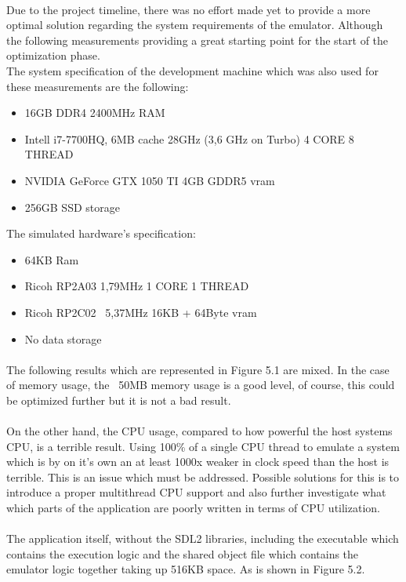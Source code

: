 \documentclass[]{report}
\begin{document}
\paragraph{ }
Due to the project timeline, there was no effort made yet to provide a more optimal solution regarding the system requirements of the emulator. Although the following measurements providing a great starting point for the start of the optimization phase.  
\\
The system specification of the development machine which was also used for these measurements are the following: 
\begin{itemize}
	\item 16GB DDR4 2400MHz RAM
	\item Intell i7-7700HQ, 6MB cache 28GHz (3,6 GHz on Turbo) 4 CORE 8 THREAD
	\item NVIDIA GeForce GTX 1050 TI 4GB GDDR5 vram
	\item 256GB SSD storage
\end{itemize}
\pagebreak
The simulated hardware's specification:
\begin{itemize}
	\item 64KB Ram
	\item Ricoh RP2A03 1,79MHz 1 CORE 1 THREAD
	\item Ricoh RP2C02 ~5,37MHz 16KB + 64Byte vram
	\item No data storage 
\end{itemize}

\paragraph{ }
The following results which are represented in Figure 5.1 are mixed. In the case of memory usage, the ~50MB memory usage is a good level, of course, this could be optimized further but it is not a bad result.
\paragraph{ }
On the other hand, the CPU usage, compared to how powerful the host systems CPU, is a terrible result. Using 100\% of a single CPU thread to emulate a system which is by on it's own an at least 1000x weaker in clock speed than the host is terrible. This is an issue which must be addressed. Possible solutions for this is to introduce a proper multithread CPU support and also further investigate what which parts of the application are poorly written in terms of CPU utilization.
\paragraph{ }
The application itself, without the SDL2 libraries, including the executable which contains the execution logic and the shared object file which contains the emulator logic together taking up 516KB space. As is shown in Figure 5.2.
\end{document}
